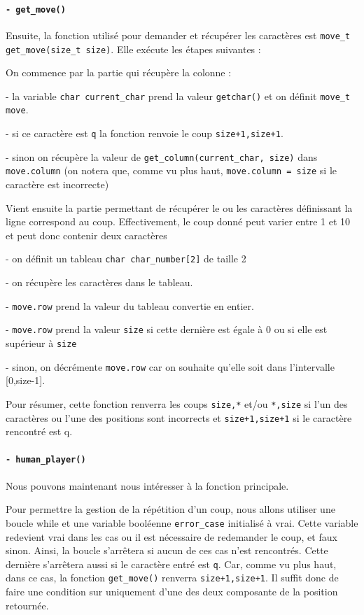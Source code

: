 \documentclass{report}
\begin{document}
\paragraph{\texttt{- get\_move() }}

Ensuite, la fonction utilisé pour demander et récupérer les caractères est \texttt{move\_t get\_move(size\_t size)}. Elle exécute les étapes suivantes :

On commence par la partie qui récupère la colonne :

- la variable \texttt{char current\_char} prend la valeur \texttt{getchar()} et on définit \texttt{move\_t move}.

- si ce caractère est \texttt{q} la fonction renvoie le coup \texttt{{size+1,size+1}}.

- sinon on récupère la valeur de \texttt{get\_column(current\_char, size)} dans \texttt{move.column} (on notera que, comme vu plus haut, \texttt{move.column = size} si le caractère est incorrecte)
\newline

Vient ensuite la partie permettant de récupérer le ou les caractères définissant la ligne correspond au coup. Effectivement, le coup donné peut varier entre 1 et 10 et peut donc contenir deux caractères

- on définit un tableau \texttt{char char\_number[2]} de taille 2

- on récupère les caractères dans le tableau.

- \texttt{move.row} prend la valeur du tableau convertie en entier.

- \texttt{move.row} prend la valeur \texttt{size} si cette dernière est égale à 0 ou si elle est supérieur à \texttt{size}

- sinon, on décrémente \texttt{move.row} car on souhaite qu'elle soit dans l'intervalle [0,size-1].

Pour résumer, cette fonction renverra les coups \texttt{size,*} et/ou \texttt{*,size} si l'un des caractères ou l'une des positions sont incorrects et \texttt{size+1,size+1} si le caractère rencontré est q.

\paragraph{\texttt{- human\_player() }}
Nous pouvons maintenant nous intéresser à la fonction principale.


Pour permettre la gestion de la répétition d'un coup, nous allons utiliser une boucle while et une variable booléenne \texttt{error\_case} initialisé à vrai. Cette variable redevient vrai dans les cas ou il est nécessaire de redemander le coup, et faux sinon. Ainsi, la boucle s'arrêtera si aucun de ces cas n'est rencontrés.
Cette dernière s'arrêtera aussi si le caractère entré est \texttt{q}.
Car, comme vu plus haut, dans ce cas, la fonction \texttt{get\_move()} renverra \texttt{size+1,size+1}. Il suffit donc de faire une condition sur uniquement d'une des deux composante de la position retournée.
\end{document}

